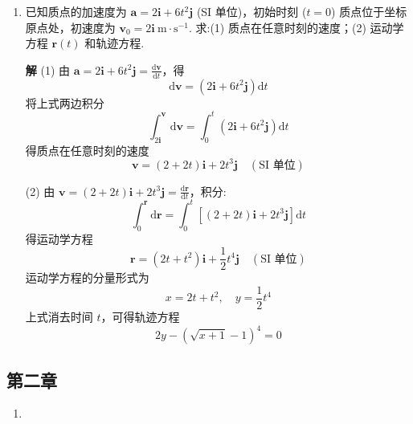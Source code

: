 \begin{enumerate}
	\vspace {2em}
	
	\item [\textbf{L1-7}]
	\quad 已知质点的加速度为 $\boldsymbol{a} = 2\boldsymbol{i} + 6t^2\boldsymbol{j}$ (SI 单位)，初始时刻 ($t=0$) 质点位于坐标原点处，初速度为 $\boldsymbol{v}_0 = 2\boldsymbol{i} \mathrm{\ m \cdot s^{-1}}$. 求:(1) 质点在任意时刻的速度；(2) 运动学方程 $\boldsymbol{r}(t)$ 和轨迹方程.
	
	\textbf{解} \quad (1) 由 $\boldsymbol{a} = 2\boldsymbol{i} + 6t^2\boldsymbol{j} = \frac{\mathrm{d}\boldsymbol{v}}{\mathrm{d}t}$，得
	$$
	\mathrm{d}\boldsymbol{v} = (2\boldsymbol{i} + 6t^2\boldsymbol{j})\mathrm{d}t
	$$
	将上式两边积分
	$$
	\int_{2\boldsymbol{i}}^{\boldsymbol{v}} \mathrm{d}\boldsymbol{v} = \int_{0}^{t} (2\boldsymbol{i} + 6t^2\boldsymbol{j})\mathrm{d}t
	$$
	得质点在任意时刻的速度
	$$
	\boldsymbol{v} = (2 + 2t)\boldsymbol{i} + 2t^3\boldsymbol{j} \quad (\text{SI 单位})
	$$
	
	(2) 由 $\boldsymbol{v} = (2 + 2t)\boldsymbol{i} + 2t^3\boldsymbol{j} = \frac{\mathrm{d}\boldsymbol{r}}{\mathrm{d}t}$，积分:
	$$
	\int_{0}^{\boldsymbol{r}} \mathrm{d}\boldsymbol{r} = \int_{0}^{t} \left[ (2 + 2t)\boldsymbol{i} + 2t^3\boldsymbol{j} \right] \mathrm{d}t
	$$
	得运动学方程
	$$
	\boldsymbol{r} = (2t + t^2)\boldsymbol{i} + \frac{1}{2}t^4\boldsymbol{j} \quad (\text{SI 单位})
	$$
	运动学方程的分量形式为
	$$
	x = 2t + t^2, \quad y = \frac{1}{2}t^4
	$$
	上式消去时间 $t$，可得轨迹方程
	$$
	2y - \left(\sqrt{x + 1} - 1\right)^4 = 0
	$$

\end{enumerate}

\subsection{第二章}

\begin{enumerate}
	\item
\end{enumerate}












